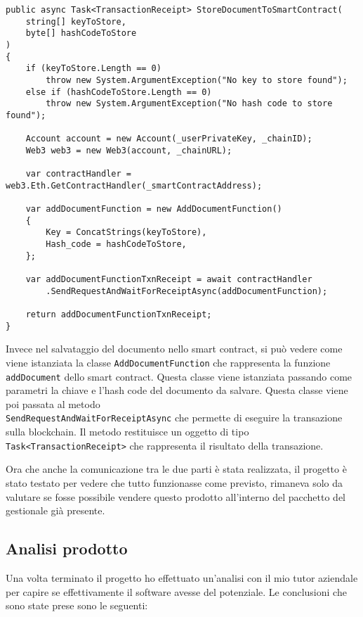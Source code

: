 \newpage

\begin{lstlisting}[language=CSharp]
public async Task<TransactionReceipt> StoreDocumentToSmartContract(
    string[] keyToStore,
    byte[] hashCodeToStore
)
{
    if (keyToStore.Length == 0)
        throw new System.ArgumentException("No key to store found");
    else if (hashCodeToStore.Length == 0) 
        throw new System.ArgumentException("No hash code to store found");

    Account account = new Account(_userPrivateKey, _chainID);
    Web3 web3 = new Web3(account, _chainURL);

    var contractHandler = web3.Eth.GetContractHandler(_smartContractAddress);

    var addDocumentFunction = new AddDocumentFunction()
    {
        Key = ConcatStrings(keyToStore),
        Hash_code = hashCodeToStore,
    };

    var addDocumentFunctionTxnReceipt = await contractHandler
        .SendRequestAndWaitForReceiptAsync(addDocumentFunction);

    return addDocumentFunctionTxnReceipt;
}\end{lstlisting}

Invece nel salvataggio del documento nello smart contract, si può vedere come
viene istanziata la classe \texttt{AddDocumentFunction} che rappresenta la
funzione \texttt{addDocument} dello smart contract. Questa classe viene
istanziata passando come parametri la chiave e l'hash code del documento da
salvare. Questa classe viene poi passata al metodo \\
\texttt{SendRequestAndWaitForReceiptAsync} che permette di eseguire la
transazione sulla blockchain. Il metodo restituisce un oggetto di tipo
\texttt{Task<TransactionReceipt>} che rappresenta il risultato della
transazione.

Ora che anche la comunicazione tra le due parti è stata realizzata,
il progetto è stato testato per vedere che tutto funzionasse come previsto, 
rimaneva solo da valutare se fosse possibile vendere questo prodotto 
all'interno del pacchetto del gestionale già presente.

\subsection{Analisi prodotto}
Una volta terminato il progetto ho effettuato un'analisi con il mio tutor 
aziendale per capire se effettivamente il software avesse del potenziale.
Le conclusioni che sono state prese sono le seguenti:

